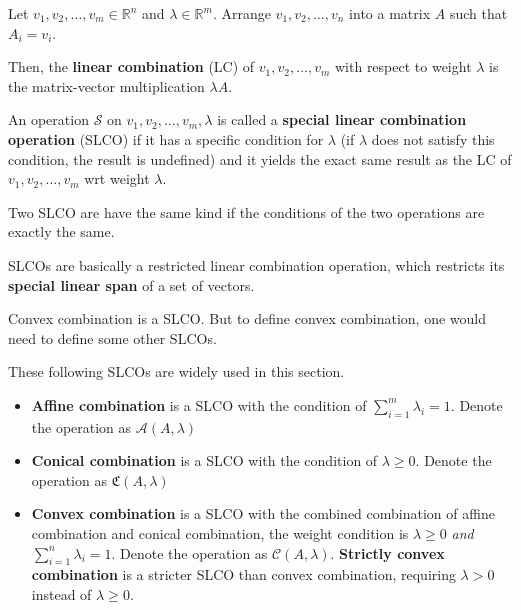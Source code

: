 \begin{definition}
  Let \( v_{1}, v_{2}, \ldots , v_{m} \in \mathbb{R}^{n} \) and \( \lambda \in
  \mathbb{R}^{m} \). Arrange \( v_{1}, v_{2}, \ldots , v_{n} \) into a matrix \(
  A\) such that \( A_{i} = v_{i} \).

  Then, the \textbf{linear combination} (LC) of \( v_{1}, v_{2}, \ldots, v_{m}
  \) with respect to weight \( \lambda \) is the matrix-vector multiplication \(
  \lambda A\).

  An operation \( \mathcal{S} \) on \( v_{1}, v_{2}, \ldots , v_{m}, \lambda \)
  is called a \textbf{special linear combination operation} (SLCO) if it has a specific
  condition for \( \lambda \) (if \( \lambda \) does not satisfy this condition,
  the result is undefined) and it yields the exact same result as the LC of \(
  v_{1}, v_{2}, \ldots , v_{m} \) wrt weight \( \lambda \).

  Two SLCO are have the same kind if the conditions of the two operations are
  exactly the same.
\end{definition}

SLCOs are basically a restricted linear combination operation, which restricts
its \textbf{special linear span} of a set of vectors.

Convex combination is a SLCO. But to define convex combination, one would need
to define some other SLCOs.

\begin{definition}
  These following SLCOs are widely used in this section.
\begin{itemize}
  \item \textbf{Affine combination} is a SLCO with the condition of \( \sum_{i =
    1}^{m} \lambda_{i} = 1 \). Denote the operation as \(
    \mathcal{A}(A, \lambda) \)
  \item \textbf{Conical combination} is a SLCO with the condition of \( \lambda
    \ge  0\). Denote the operation as \( \mathfrak{C}(A, \lambda) \)
  \item \textbf{Convex combination} is a SLCO with the combined combination of
    affine combination and conical combination, the weight condition is \(
    \lambda \ge 0 \) \textit{and} \( \sum_{i = 1}^{n} \lambda_{i} = 1 \). Denote
    the operation as \( \mathcal{C}(A, \lambda) \). \textbf{Strictly convex
    combination} is a stricter SLCO than convex combination, requiring
    \( \lambda > 0 \) instead of \( \lambda \ge 0 \).
\end{itemize}
\end{definition}

